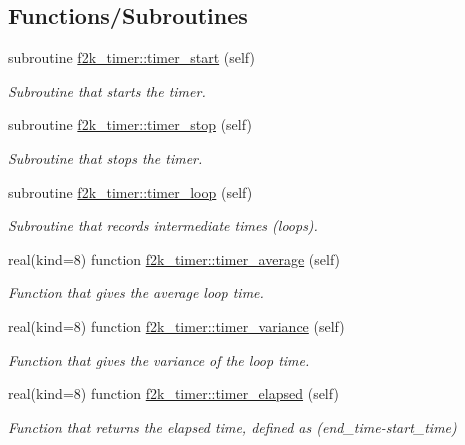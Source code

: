 \subsection*{Functions/\+Subroutines}
\begin{DoxyCompactItemize}
\item 
subroutine \hyperlink{namespacef2k__timer_a70057597d71664f70b9164c7d741c839}{f2k\+\_\+timer\+::timer\+\_\+start} (self)
\begin{DoxyCompactList}\small\item\em Subroutine that starts the timer. \end{DoxyCompactList}\item 
subroutine \hyperlink{namespacef2k__timer_a9dcd2c81036ce32527bd3460606694b4}{f2k\+\_\+timer\+::timer\+\_\+stop} (self)
\begin{DoxyCompactList}\small\item\em Subroutine that stops the timer. \end{DoxyCompactList}\item 
subroutine \hyperlink{namespacef2k__timer_a605274108f4afabff1821ec1a1243575}{f2k\+\_\+timer\+::timer\+\_\+loop} (self)
\begin{DoxyCompactList}\small\item\em Subroutine that records intermediate times (loops). \end{DoxyCompactList}\item 
real(kind=8) function \hyperlink{namespacef2k__timer_a02dfc06ae09be917c91560357d92ab3f}{f2k\+\_\+timer\+::timer\+\_\+average} (self)
\begin{DoxyCompactList}\small\item\em Function that gives the average loop time. \end{DoxyCompactList}\item 
real(kind=8) function \hyperlink{namespacef2k__timer_a2794f7fb1f1084d23939c19d812642ad}{f2k\+\_\+timer\+::timer\+\_\+variance} (self)
\begin{DoxyCompactList}\small\item\em Function that gives the variance of the loop time. \end{DoxyCompactList}\item 
real(kind=8) function \hyperlink{namespacef2k__timer_a2be6741422c75d3280019867de272e19}{f2k\+\_\+timer\+::timer\+\_\+elapsed} (self)
\begin{DoxyCompactList}\small\item\em Function that returns the elapsed time, defined as (end\+\_\+time-\/start\+\_\+time) \end{DoxyCompactList}\item 

\end{DoxyCompactItemize}
